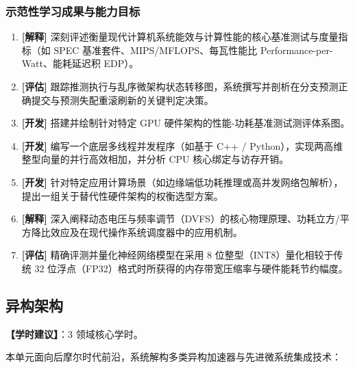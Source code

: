 \subsubsection{示范性学习成果与能力目标}
\begin{enumerate}
    \item \textbf{[解释]} 深刻评述衡量现代计算机系统能效与计算性能的核心基准测试与度量指标（如 SPEC 基准套件、MIPS/MFLOPS、每瓦性能比 Performance-per-Watt、能耗延迟积 EDP）。
    \item \textbf{[评估]} 跟踪推测执行与乱序微架构状态转移图，系统撰写并剖析在分支预测正确提交与预测失配重滚刷新的关键判定决策。
    \item \textbf{[开发]} 搭建并绘制针对特定 GPU 硬件架构的性能-功耗基准测试测评体系图。
    \item \textbf{[开发]} 编写一个底层多线程并发程序（如基于 C++ / Python），实现两高维整型向量的并行高效相加，并分析 CPU 核心绑定与访存开销。
    \item \textbf{[开发]} 针对特定应用计算场景（如边缘端低功耗推理或高并发网络包解析），提出一组关于替代性硬件架构的权衡选型方案。
    \item \textbf{[解释]} 深入阐释动态电压与频率调节（DVFS）的核心物理原理、功耗立方/平方降比效应及在现代操作系统调度器中的应用机制。
    \item \textbf{[评估]} 精确评测并量化神经网络模型在采用 8 位整型（INT8）量化相较于传统 32 位浮点（FP32）格式时所获得的内存带宽压缩率与硬件能耗节约幅度。
\end{enumerate}

\subsection{异构架构}
\textbf{【学时建议】}：3 领域核心学时。

本单元面向后摩尔时代前沿，系统解构多类异构加速器与先进微系统集成技术：

